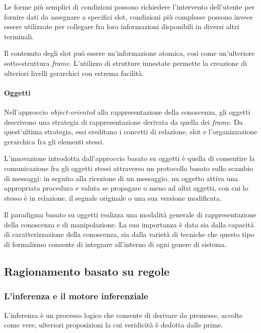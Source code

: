 Le forme più semplici di condizioni possono richiedere l'intervento dell'utente per fornire dati da assegnare a specifici slot, condizioni più complesse possono invece essere utilizzate per collegare fra loro informazioni disponibili in diversi altri terminali. 

Il contenuto degli slot può essere un'informazione atomica, così come un'ulteriore sotto-struttura \emph{frame}. L'utilizzo di strutture innestate permette la creazione di ulteriori livelli gerarchici con estrema facilità. \cite{minsky1974} 

\paragraph{Oggetti}
Nell'approccio \emph{object-oriented} alla rappresentazione della conoscenza, gli oggetti descrivono una strategia di rappresentazione derivata da quella dei \emph{frame}. Da quest'ultima strategia, essi ereditano i concetti di relazione, slot e l'organizzazione gerarchica fra gli elementi stessi.~\cite{holsapple1994object}

L'innovazione introdotta dall'approccio basato su oggetti è quella di consentire la comunicazione fra gli oggetti stessi attraverso un protocollo basato sullo scambio di messaggi: in seguito alla ricezione di un messaggio, un oggetto attiva una appropriata procedura e valuta se propagare o meno ad altri oggetti, con cui lo stesso è in relazione, il segnale originale o una sua versione modificata.~\cite{development1993}

Il paradigma basato su oggetti realizza una modalità generale di rappresentazione della conoscenza e di manipolazione. La sua importanza è data sia dalla capacità di caratterizzazione della conoscenza, sia dalla varietà di tecniche che questo tipo di formalismo consente di integrare all'interno di ogni genere di sistema.~\cite{holsapple1994object}

\subsection{Ragionamento basato su regole}

\subsubsection{L'inferenza e il motore inferenziale}

L'inferenza è un processo logico che consente di derivare da premesse, accolte come vere, ulteriori proposizioni la cui veridicità è dedotta dalle prime.

